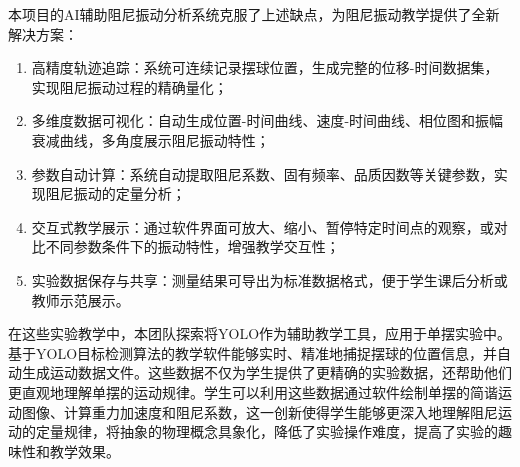 本项目的AI辅助阻尼振动分析系统克服了上述缺点，为阻尼振动教学提供了全新解决方案：

\begin{enumerate}[leftmargin=*]
    \item 高精度轨迹追踪：系统可连续记录摆球位置，生成完整的位移-时间数据集，实现阻尼振动过程的精确量化；
    
    \item 多维度数据可视化：自动生成位置-时间曲线、速度-时间曲线、相位图和振幅衰减曲线，多角度展示阻尼振动特性；
    
    \item 参数自动计算：系统自动提取阻尼系数、固有频率、品质因数等关键参数，实现阻尼振动的定量分析；
    
    \item 交互式教学展示：通过软件界面可放大、缩小、暂停特定时间点的观察，或对比不同参数条件下的振动特性，增强教学交互性；
    
    \item 实验数据保存与共享：测量结果可导出为标准数据格式，便于学生课后分析或教师示范展示。
\end{enumerate}

在这些实验教学中，本团队探索将YOLO作为辅助教学工具，应用于单摆实验中。基于YOLO目标检测算法的教学软件能够实时、精准地捕捉摆球的位置信息，并自动生成运动数据文件。这些数据不仅为学生提供了更精确的实验数据，还帮助他们更直观地理解单摆的运动规律。学生可以利用这些数据通过软件绘制单摆的简谐运动图像、计算重力加速度和阻尼系数，这一创新使得学生能够更深入地理解阻尼运动的定量规律，将抽象的物理概念具象化，降低了实验操作难度，提高了实验的趣味性和教学效果。
